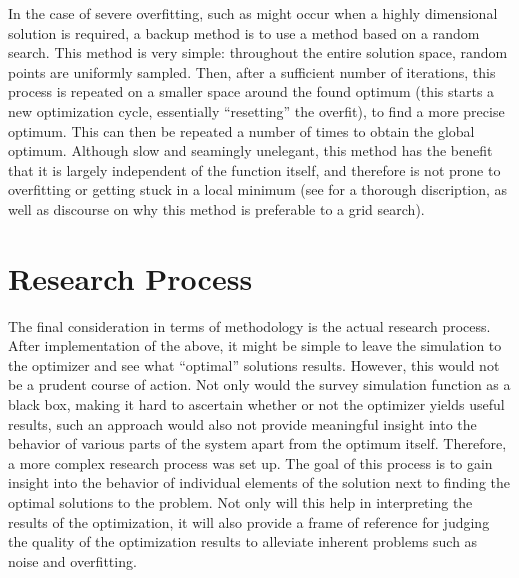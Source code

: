 In the case of severe overfitting, such as might occur when a highly dimensional solution is required, a backup method is to use a method based on a random search. This method is very simple: throughout the entire solution space, random points are uniformly sampled. Then, after a sufficient number of iterations, this process is repeated on a smaller space around the found optimum (this starts a new optimization cycle, essentially ``resetting'' the overfit), to find a more precise optimum. This can then be repeated a number of times to obtain the global optimum. Although slow and seamingly unelegant, this method has the benefit that it is largely independent of the function itself, and therefore is not prone to overfitting or getting stuck in a local minimum (see \cite{HOML} for a thorough discription, as well as discourse on why this method is preferable to a grid search).

\section{Research Process}
\label{sec:methodologyprocess}
The final consideration in terms of methodology is the actual research process. After implementation of the above, it might be simple to leave the simulation to the optimizer and see what ``optimal'' solutions results. However, this would not be a prudent course of action. Not only would the survey simulation function as a black box, making it hard to ascertain whether or not the optimizer yields useful results, such an approach would also not provide meaningful insight into the behavior of various parts of the system apart from the optimum itself. Therefore, a more complex research process was set up. The goal of this process is to gain insight into the behavior of individual elements of the solution next to finding the optimal solutions to the problem. Not only will this help in interpreting the results of the optimization, it will also provide a frame of reference for judging the quality of the optimization results to alleviate inherent problems such as noise and overfitting.\\

